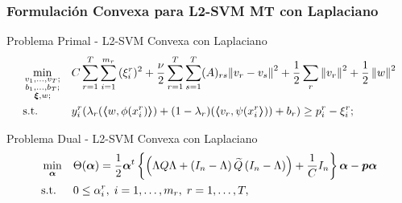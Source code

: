 \documentclass[aspectratio=43]{beamer}
\newcommand{\norm}[1]{\left\lVert#1\right\rVert}
\newcommand{\upper}[1]{\expandafter\MakeUppercase\expandafter{#1}}
\newcommand{\mymat}[1]{\upper{#1}}
\newcommand{\myvec}[1]{\bm{#1}}
\newcommand{\fv}[1]{\myvec{#1}}
\newcommand{\fm}[1]{\mymat{#1}}
\newcommand{\dotp}[2]{\bm{\left\langle} #1, #2 \bm{\right\rangle}}
\newcommand{\nsamples}{n}
\newcommand{\ntasks}{T}
\newcommand{\npertask}{m}
\begin{document}
\begin{frame}
      \frametitle{Formulación Convexa para L2-SVM MT con Laplaciano}
  
      \begin{block}{Problema Primal - L2-SVM Convexa con Laplaciano}
            \begin{equation}\nonumber
                  \begin{aligned}
                       & \min_{\substack{v_1, \ldots, v_\ntasks ;                                                                                                                                                                                                                                                                                          \\ \substack{b_1, \ldots, b_\ntasks } ; \\ \substack{\fv{\xi}}, w; }}
                       &                                             & { C \sum_{r=1}^\ntasks \sum_{i=1}^{\npertask_r} {(\xi_i^r)^2}  + \frac{\nu}{2} \sum_{r=1}^\ntasks \sum_{s=1}^T (A)_{rs} {\| {v}_r - {v}_s \|}^2 + \frac{1}{2} \sum_r \norm{{v}_r}^2 + \frac{1}{2} \norm{{w}}^2}                                                                              \\
                       & \text{s.t.}
                       &                                             & y_i^r (\lambda_r (\dotp{w}{\phi({x}_i^r)}) + (1 - \lambda_r) (\dotp{{v}_r}{\psi({x}_i^r})) + b_r) \geq p_i^r - \xi_i^r  ;
                  \end{aligned}
              \end{equation}
      \end{block}
      \begin{block}{Problema Dual - L2-SVM Convexa con Laplaciano}
            \begin{equation}\nonumber
                  \begin{aligned}
                       & \min_{\fv{\alpha}}
                       &                       & \Theta(\fv{\alpha}) = \frac{1}{2} \fv{\alpha}^t \left\lbrace  \left( \Lambda \fm{Q} \Lambda + \left(\fm{I}_{\nsamples} - \Lambda \right) \fm{\widetilde{Q}} \left(\fm{I}_{\nsamples} - \Lambda \right) \right) + \frac{1}{C} \fm{I}_\nsamples \right\rbrace \fv{\alpha} - \fv{p} \fv{\alpha}                                                            \\
                       & \text{s.t.}
                       &                       & 0 \leq \alpha_i^r, \;  i=1,\ldots,m_r,\; r=1,\ldots,T ,                                                                                                                                                                                                                                                                                                   \\

\end{aligned}
\end{equation}
\end{block}
\end{frame}
\end{document}
